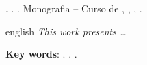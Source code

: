 
\begin{OnehalfSpacing} 

\noindent \imprimirAutorCitacaoMaiuscula. {\bfseries\imprimirtitulo}. {\imprimirdata}.  Monografia -- Curso de {\MakeUppercase\imprimircurso}, {\imprimirinstituicao}, {\imprimirlocal}, {\imprimirdata}.

\vspace{\onelineskip}
\vspace{\onelineskip}
\vspace{\onelineskip}
\vspace{\onelineskip}

\begin{resumo}[Abstract]%
\begin{otherlanguage*}{english}%
\textit{
\noindent This work presents \ldots
}

\vspace{\onelineskip}
\vspace*{\fill}
\noindent \textbf{Key words}: \imprimirKeyWordOne. \imprimirKeyWordTwo. \imprimirKeyWordThree.
\end{otherlanguage*}
\vspace{\onelineskip}
\end{resumo}

\end{OnehalfSpacing}
